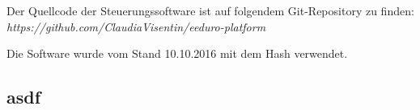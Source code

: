 Der Quellcode der Steuerungssoftware ist auf folgendem Git-Repository zu finden: \\
\textit{https://github.com/ClaudiaVisentin/eeduro-platform }

Die Software wurde vom Stand 10.10.2016 mit dem Hash \textit{} verwendet.


\subsection{asdf}
